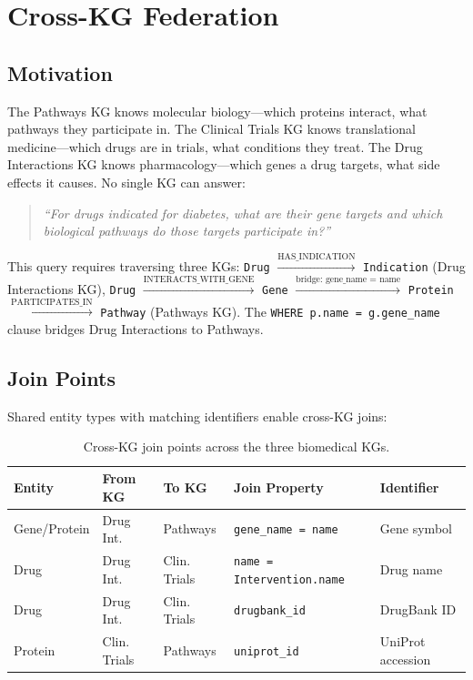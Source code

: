 \documentclass[11pt]{article}
\begin{document}
\section{Cross-KG Federation}

\subsection{Motivation}

The Pathways KG knows molecular biology---which proteins interact, what pathways they participate in. The Clinical Trials KG knows translational medicine---which drugs are in trials, what conditions they treat. The Drug Interactions KG knows pharmacology---which genes a drug targets, what side effects it causes. No single KG can answer:

\begin{quote}
\emph{``For drugs indicated for diabetes, what are their gene targets and which biological pathways do those targets participate in?''}
\end{quote}

This query requires traversing three KGs: \texttt{Drug} $\xrightarrow{\text{HAS\_INDICATION}}$ \texttt{Indication} (Drug Interactions KG), \texttt{Drug} $\xrightarrow{\text{INTERACTS\_WITH\_GENE}}$ \texttt{Gene} $\xrightarrow{\text{bridge: gene\_name = name}}$ \texttt{Protein} $\xrightarrow{\text{PARTICIPATES\_IN}}$ \texttt{Pathway} (Pathways KG). The \texttt{WHERE p.name = g.gene\_name} clause bridges Drug Interactions to Pathways.

\subsection{Join Points}

Shared entity types with matching identifiers enable cross-KG joins:

\begin{table}[H]
\centering
\caption{Cross-KG join points across the three biomedical KGs.}
\label{tab:joins}
\small
\begin{tabular}{lllll}
\toprule
\textbf{Entity} & \textbf{From KG} & \textbf{To KG} & \textbf{Join Property} & \textbf{Identifier} \\
\midrule
Gene/Protein & Drug Int. & Pathways & \texttt{gene\_name = name} & Gene symbol \\
Drug & Drug Int. & Clin. Trials & \texttt{name = Intervention.name} & Drug name \\
Drug & Drug Int. & Clin. Trials & \texttt{drugbank\_id} & DrugBank ID \\
Protein & Clin. Trials & Pathways & \texttt{uniprot\_id} & UniProt accession \\
\bottomrule
\end{tabular}
\end{table}
\end{document}

